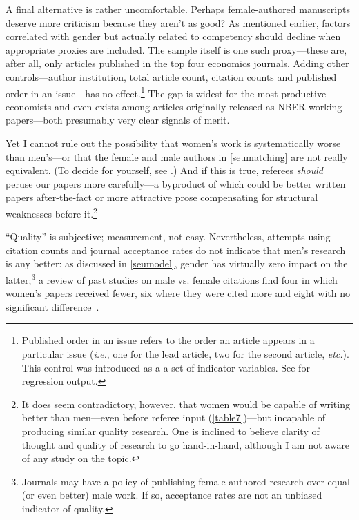 A final alternative is rather uncomfortable. Perhaps female-authored manuscripts deserve more criticism because they aren't as good? As mentioned earlier, factors correlated with gender but actually related to competency should decline when appropriate proxies are included. The sample itself is one such proxy---these are, after all, only articles published in the top four economics journals. Adding other controls---author institution, total article count, citation counts and published order in an issue---has no effect.\footnote{Published order in an issue refers to the order an article appears in a particular issue (\emph{i.e.}, one for the lead article, two for the second article, \emph{etc.}). This control was introduced as a a set of indicator variables. See  \citet[][p. 42 and p. 44]{Hengel2016} for regression output.} The gap is widest for the most productive economists and even exists among articles originally released as NBER working papers---both presumably very clear signals of merit.

Yet I cannot rule out the possibility that women's work is systematically worse than men's---or that the female and male authors in \autoref{seumatching} are not really equivalent. (To decide for yourself, see .) And if this is true, referees \emph{should} peruse our papers more carefully---a byproduct of which could be better written papers after-the-fact or more attractive prose compensating for structural weaknesses before it.\footnote{It does seem contradictory, however, that women would be capable of writing better than men---even before referee input (\autoref{table7})---but incapable of producing similar quality research. One is inclined to believe clarity of thought and quality of research to go hand-in-hand, although I am not aware of any study on the topic.}

``Quality'' is subjective; measurement, not easy. Nevertheless, attempts using citation counts and journal acceptance rates do not indicate that men's research is any better: as discussed in \autoref{seumodel}, gender has virtually zero impact on the latter;\footnote{Journals may have a policy of publishing female-authored research over equal (or even better) male work. If so, acceptance rates are not an unbiased indicator of quality.} a review of past studies on male vs. female citations find four in which women's papers received fewer, six where they were cited more and eight with no significant difference~\citep{Ceci2014}.


